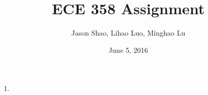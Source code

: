 \documentclass[12pt]{article}
\title{ECE 358 Assignment }
\author{Jason Shao, Lihao Luo, Minghao Lu}
\date{June 5, 2016}
\begin{document}
\maketitle
\renewcommand{\thesubsection}{Problem \arabic{subsection}}


\def\question#1{\item[\bf #1.]}
\def\part#1{\item[\bf #1)]}
\newcommand{\pc}[1]{\mbox{\textbf{#1}}} %

\begin{enumerate}
    \item 
  
\end{enumerate}
\end{document}
